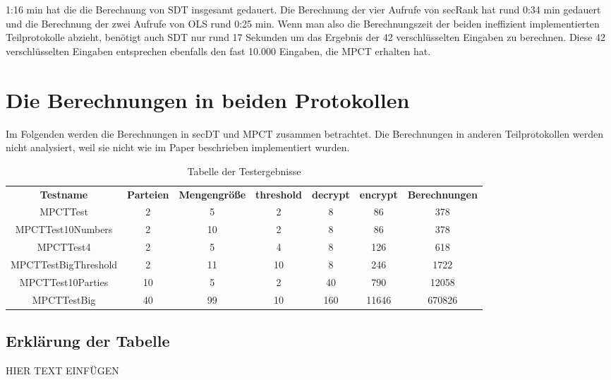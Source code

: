 1:16 min hat die die Berechnung von SDT insgesamt gedauert. Die Berechnung der vier Aufrufe von secRank hat rund 0:34 min gedauert und die Berechnung der zwei Aufrufe von OLS rund 0:25 min. Wenn man also die Berechnungszeit der beiden ineffizient implementierten Teilprotokolle abzieht, benötigt auch SDT nur rund 17 Sekunden um das Ergebnis der 42 verschlüsselten Eingaben zu berechnen. Diese 42 verschlüsselten Eingaben entsprechen ebenfalls den fast 10.000 Eingaben, die MPCT erhalten hat.



\section{Die Berechnungen in beiden Protokollen}
Im Folgenden werden die Berechnungen in secDT und MPCT zusammen betrachtet.
Die Berechnungen in anderen Teilprotokollen werden nicht analysiert, weil sie nicht wie im Paper \cite{Doettling2021} beschrieben implementiert wurden.

   \begin{table}[!h]
     \centering
     \begin{tabular}{ccccccc}
       \textbf{Testname} & \textbf{Parteien} & \textbf{Mengengröße} & \textbf{threshold} & \textbf{decrypt} &\textbf{encrypt} & \textbf{Berechnungen}\\
       MPCTTest & 2 & 5 & 2 & 8 & 86 & 378\\
       MPCTTest10Numbers & 2 & 10 & 2 & 8 & 86 & 378\\
       MPCTTest4 & 2 & 5 & 4 & 8 & 126 & 618\\
       MPCTTestBigThreshold & 2 & 11 & 10 & 8 & 246 & 1722\\
       MPCTTest10Parties & 10 & 5 & 2 & 40 & 790 & 12058\\
       MPCTTestBig &40 & 99 & 10 & 160 & 11646 & 670826\\
     \end{tabular}

     \caption{Tabelle der Testergebnisse}
     \label{tbl:results}

   \end{table}

\subsection{Erklärung der Tabelle}   
HIER TEXT EINFÜGEN

